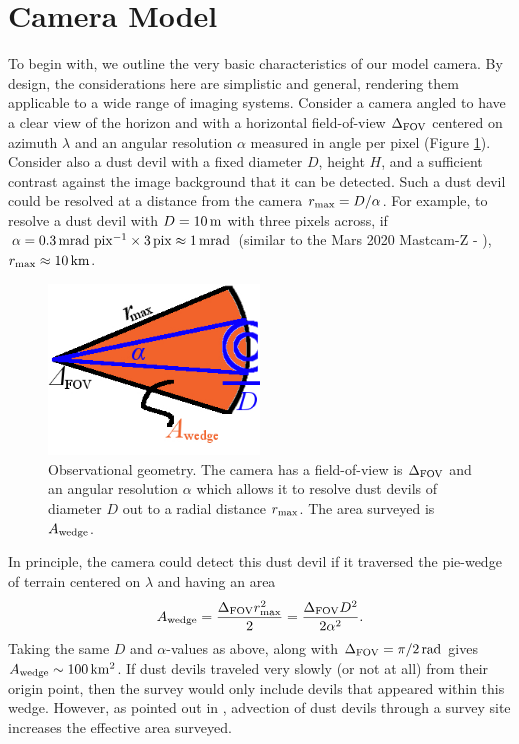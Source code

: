 \documentclass{aastex63}
\begin{document}
\section{Camera Model}
To begin with, we outline the very basic characteristics of our model camera. By design, the considerations here are simplistic and general, rendering them applicable to a wide range of imaging systems. Consider a camera angled to have a clear view of the horizon and with a horizontal field-of-view $\Delta_{\rm FOV}$ centered on azimuth $\lambda$ and an angular resolution $\alpha$ measured in angle per pixel (Figure \ref{fig:Awedge}). Consider also a dust devil with a fixed diameter $D$, height $H$, and a sufficient contrast against the image background that it can be detected. Such a dust devil could be resolved at a distance from the camera $r_{\rm max} = D/\alpha$. For example, to resolve a dust devil with $D = 10\,{\rm m}$ with three pixels across, if $\alpha = 0.3\,{\rm mrad\ pix^{-1}} \times 3\,{\rm pix} \approx 1\,{\rm mrad}$ (similar to the Mars 2020 Mastcam-Z - \citealp{2017E&SS....4..396B}), $r_{\rm max} \approx 10\,{\rm km}$.

\begin{figure}
    \centering
    \includegraphics[width=0.5\textwidth]{figures/Awedge.jpg}
    \caption{Observational geometry. The camera has a field-of-view is $\Delta_{\rm FOV}$ and an angular resolution $\alpha$ which allows it to resolve dust devils of diameter $D$ out to a radial distance $r_{\rm max}$. The area surveyed is $A_{\rm wedge}$.}
    \label{fig:Awedge}
\end{figure}

In principle, the camera could detect this dust devil if it traversed the pie-wedge of terrain centered on $\lambda$ and having an area 
\begin{equation}
    A_{\rm wedge} = \frac{\Delta_{\rm FOV} r_{\rm max}^2}{2} = \frac{\Delta_{\rm FOV}D^2}{2 \alpha^2}.
    \label{eqn:A_wedge}
\end{equation}
Taking the same $D$ and $\alpha$-values as above, along with $\Delta_{\rm FOV} = \pi/2\,{\rm rad}$ gives $A_{\rm wedge} \sim 100\,{\rm km^2}$. If dust devils traveled very slowly (or not at all) from their origin point, then the survey would only include devils that appeared within this wedge. However, as pointed out in \citet{2014JAtS...71.4461L}, advection of dust devils through a survey site increases the effective area surveyed. 
\end{document}

